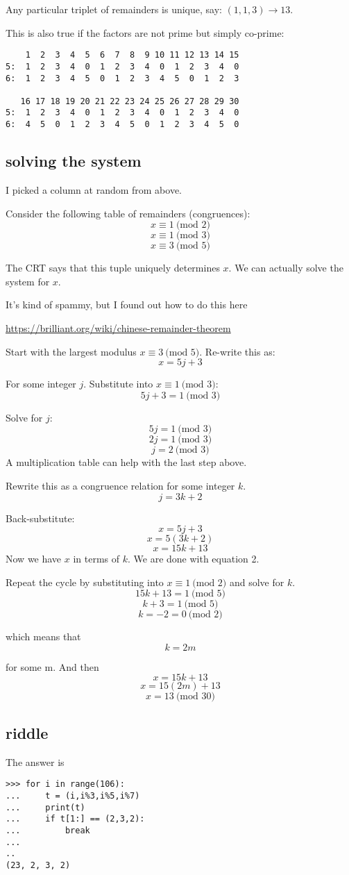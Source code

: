 \documentclass[11pt, oneside]{article}
\begin{document}
Any particular triplet of remainders is unique, say:  $(1,1,3) \rightarrow 13$.

This is also true if the factors are not prime but simply co-prime:

\begin{verbatim}
    1  2  3  4  5  6  7  8  9 10 11 12 13 14 15
5:  1  2  3  4  0  1  2  3  4  0  1  2  3  4  0
6:  1  2  3  4  5  0  1  2  3  4  5  0  1  2  3

   16 17 18 19 20 21 22 23 24 25 26 27 28 29 30
5:  1  2  3  4  0  1  2  3  4  0  1  2  3  4  0
6:  4  5  0  1  2  3  4  5  0  1  2  3  4  5  0
\end{verbatim}

\subsection*{solving the system}

I picked a column at random from above.  

Consider the following table of remainders (congruences):
\[ x \equiv 1 \ \text{(mod 2)} \]
\[ x \equiv 1 \ \text{(mod 3)} \]
\[ x \equiv 3 \ \text{(mod 5)} \]

The CRT says that this tuple uniquely determines $x$.  We can actually solve the system for $x$.

It's kind of spammy, but I found out how to do this here

\url{https://brilliant.org/wiki/chinese-remainder-theorem}

Start with the largest modulus $x \equiv 3 \ \text{(mod 5)}$.  Re-write this as: 
\[  x = 5j + 3 \]

For some integer $j$.   Substitute into $x \equiv 1 \ \text{(mod 3)}$:
\[  5j + 3 = 1 \ \text{(mod 3)}  \]

Solve for $j$:
\[  5j = 1 \ \text{(mod 3)}  \]
\[  2j = 1 \ \text{(mod 3)}  \]
\[  j = 2 \ \text{(mod 3)}  \]
A multiplication table can help with the last step above.

Rewrite this as a congruence relation for some integer $k$.
\[   j = 3k + 2 \]

Back-substitute:
\[  x = 5j + 3 \]
\[  x = 5(3k + 2) \]
\[  x = 15k + 13 \]
Now we have $x$ in terms of $k$.  We are done with equation 2.

Repeat the cycle by substituting into $x \equiv 1 \ \text{(mod 2)}$ and solve for $k$.
\[  15k + 13 = 1 \ \text{(mod 5)}  \]
\[  k + 3 = 1 \ \text{(mod 5)} \]
\[  k = -2 = 0 \ \text{(mod 2)} \]

which means that
\[  k = 2m \]

for some m.  And then
\[  x = 15k + 13 \]
\[  x = 15(2m) + 13 \]
\[  x = 13 \ \text{(mod 30)}  \]

\subsection*{riddle}

The answer is 

\begin{verbatim}
>>> for i in range(106):
...     t = (i,i%3,i%5,i%7)
...     print(t)
...     if t[1:] == (2,3,2):
...         break
... 
..
(23, 2, 3, 2)
\end{verbatim}
\end{document}
